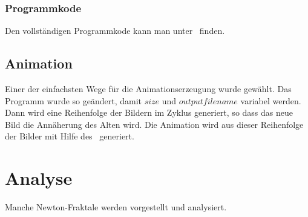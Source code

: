 \documentclass[a4paper,12pt]{llncs}
\numberwithin{equation}{section}
\begin{document}
\subsubsection{Programmkode}
Den vollständigen Programmkode kann man unter~\cite{source} finden.

\subsection{Animation}\label{subs:vis:anime}
Einer der einfachsten Wege für die Animationserzeugung wurde gewählt. 
Das Programm wurde so geändert, damit $size$ und $outputfilename$ variabel werden. 
Dann wird eine Reihenfolge der Bildern im Zyklus generiert, so dass das neue Bild die Annäherung des Alten wird.
Die Animation wird aus dieser Reihenfolge der Bilder mit Hilfe des~\cite{animegen} generiert.

\section{Analyse}\label{sec:analy}
Manche Newton-Fraktale werden vorgestellt und analysiert.
\end{document}
